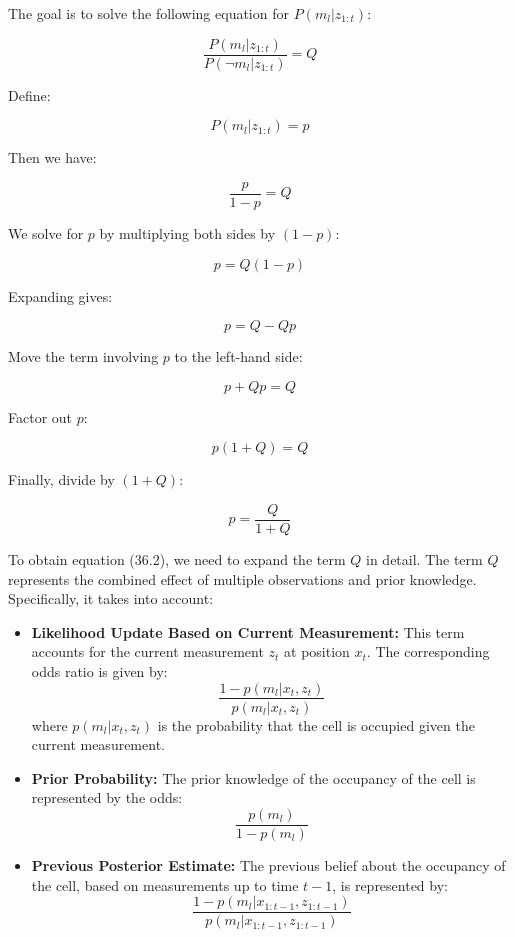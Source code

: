 \documentclass[template,12pt,a4paper,enabledeprecatedfontcommands]{template}
\begin{document}
\noindent The goal is to solve the following equation for \( P(m_l | z_{1:t}) \):

\[
\frac{P(m_l | z_{1:t})}{P(\neg m_l | z_{1:t})} = Q
\]

\noindent Define:

\[
P(m_l | z_{1:t}) = p
\]

\noindent Then we have:

\[
\frac{p}{1 - p} = Q
\]

\noindent We solve for \( p \) by multiplying both sides by \( (1 - p) \):

\[
p = Q (1 - p)
\]

\noindent Expanding gives:

\[
p = Q - Qp
\]

\noindent Move the term involving \( p \) to the left-hand side:

\[
p + Qp = Q
\]

\noindent Factor out \( p \):

\[
p (1 + Q) = Q
\]

\noindent Finally, divide by \( (1 + Q) \):

\[
p = \frac{Q}{1 + Q}
\]

\noindent To obtain equation (36.2), we need to expand the term \( Q \) in detail. The term \( Q \) represents the combined effect of multiple observations and prior knowledge. Specifically, it takes into account:

\begin{itemize}
    \item \textbf{Likelihood Update Based on Current Measurement:} This term accounts for the current measurement \( z_t \) at position \( x_t \). The corresponding odds ratio is given by:
    \[
    \frac{1 - p(m_l | x_t, z_t)}{p(m_l | x_t, z_t)}
    \]
    where \( p(m_l | x_t, z_t) \) is the probability that the cell is occupied given the current measurement.

    \item \textbf{Prior Probability:} The prior knowledge of the occupancy of the cell is represented by the odds:
    \[
    \frac{p(m_l)}{1 - p(m_l)}
    \]

    \item \textbf{Previous Posterior Estimate:} The previous belief about the occupancy of the cell, based on measurements up to time \( t-1 \), is represented by:
    \[
    \frac{1 - p(m_l | x_{1:t-1}, z_{1:t-1})}{p(m_l | x_{1:t-1}, z_{1:t-1})}
    \]
\end{itemize}
\end{document}
